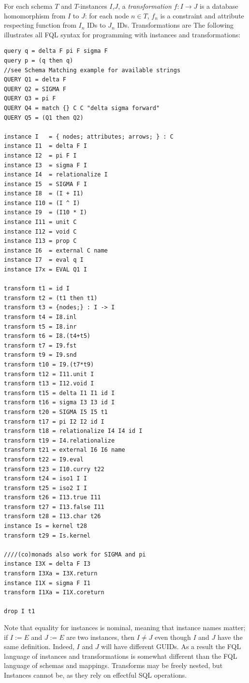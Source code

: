 \documentclass[12pt]{article}
\begin{document}
For each schema $T$ and $T$-instances $I$,$J$, a {\it transformation} $f : I \to J$ is a database homomorphism from $I$ to $J$: for each node $n \in T$, $f_n$ is a constraint and attribute respecting function from $I_n$ IDs to $J_n$ IDs.  Transformations are The following illustrates all FQL syntax for programming with instances and transformations:

\begin{verbatim}
query q = delta F pi F sigma F
query p = (q then q)
//see Schema Matching example for available strings
QUERY Q1 = delta F
QUERY Q2 = SIGMA F
QUERY Q3 = pi F
QUERY Q4 = match {} C C "delta sigma forward"
QUERY Q5 = (Q1 then Q2)

instance I   = { nodes; attributes; arrows; } : C
instance I1  = delta F I
instance I2  = pi F I
instance I3  = sigma F I
instance I4  = relationalize I
instance I5  = SIGMA F I
instance I8  = (I + I1)
instance I10 = (I ^ I)
instance I9  = (I10 * I)
instance I11 = unit C
instance I12 = void C
instance I13 = prop C
instance I6  = external C name
instance I7  = eval q I
instance I7x = EVAL Q1 I

transform t1 = id I
transform t2 = (t1 then t1)
transform t3 = {nodes;} : I -> I
transform t4 = I8.inl
transform t5 = I8.inr
transform t6 = I8.(t4+t5)
transform t7 = I9.fst
transform t9 = I9.snd
transform t10 = I9.(t7*t9)
transform t12 = I11.unit I
transform t13 = I12.void I
transform t15 = delta I1 I1 id I
transform t16 = sigma I3 I3 id I
transform t20 = SIGMA I5 I5 t1
transform t17 = pi I2 I2 id I
transform t18 = relationalize I4 I4 id I
transform t19 = I4.relationalize
transform t21 = external I6 I6 name
transform t22 = I9.eval
transform t23 = I10.curry t22
transform t24 = iso1 I I
transform t25 = iso2 I I
transform t26 = I13.true I11
transform t27 = I13.false I11
transform t28 = I13.char t26
instance Is = kernel t28
transform t29 = Is.kernel

////(co)monads also work for SIGMA and pi
instance I3X = delta F I3
transform I3Xa = I3X.return
instance I1X = sigma F I1
transform I1Xa = I1X.coreturn

drop I t1
\end{verbatim}
Note that equality for instances is nominal, meaning that instance names matter; if $I := E$ and $J := E$ are two instances, then $I \neq J$ even though $I$ and $J$ have the same definition.  Indeed, $I$ and $J$ will have different GUIDs. As a result the FQL language of instances and transformations is somewhat different than the FQL language of schemas and mappings.  Transforms may be freely nested, but Instances cannot be, as they rely on effectful SQL operations.
\end{document}
